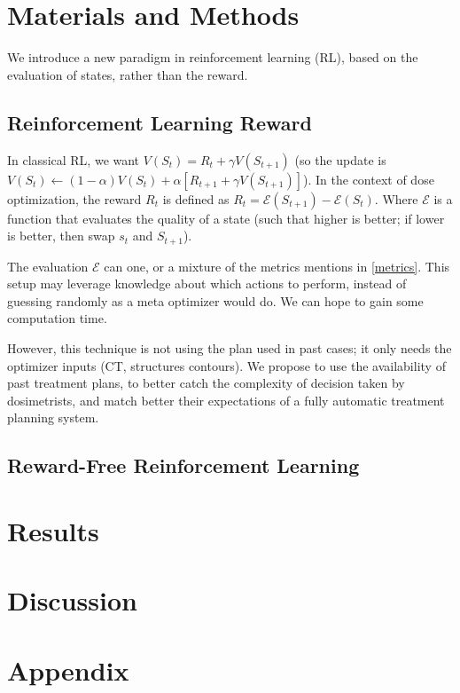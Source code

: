 \section{Materials and Methods}
We introduce a new paradigm in reinforcement learning (RL), based on the evaluation of states, rather than the reward.

\subsection{Reinforcement Learning Reward}
In classical RL, we want $V(S_t) = R_t + \gamma V(S_{t+1})$
(so the update is $V(S_t) \leftarrow (1-\alpha) V(S_t) + \alpha \left[ R_{t+1} + \gamma V(S_{t+1}) \right]$).
In the context of dose optimization, the reward $R_t$ is defined as $R_t = \mathcal{E}(S_{t+1}) - \mathcal{E}(S_t)$.
Where $\mathcal{E}$ is a function that evaluates the quality of a state (such that higher is better; if lower is better, then swap $s_t$ and $S_{t+1}$).

The evaluation $\mathcal{E}$ can one, or a mixture of the metrics mentions in \ref{metrics}.
This setup may leverage knowledge about which actions to perform, instead of guessing randomly as a meta optimizer would do.
We can hope to gain some computation time.

However, this technique is not using the plan used in past cases; it only needs the optimizer inputs (CT, structures contours).
We propose to use the availability of past treatment plans, to better catch the complexity of decision taken by dosimetrists, and match better their expectations of a fully automatic treatment planning system.

\subsection{Reward-Free Reinforcement Learning}


\section{Results}

\section{Discussion}



\section*{Appendix}

